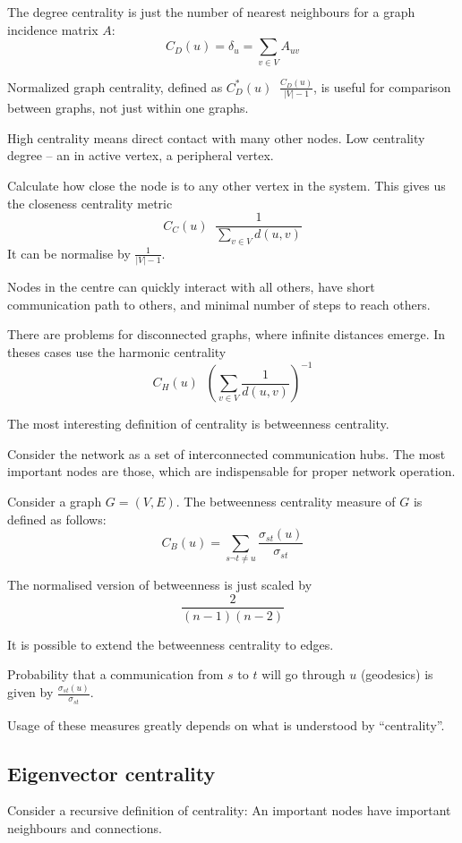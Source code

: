 \documentclass[a4paper]{article}
\newcommand{\brac}[1]{{\left ( #1 \right )}}
\newcommand{\abs}[1]{{\left | #1 \right |}}
\newcommand{\defn}{\mathop{\overset{\Delta}{=}}\nolimits}
\begin{document}
The degree centrality is just the number of nearest neighbours for a graph incidence matrix $A$:
\[C_D(u) = \delta_u = \sum_{v\in V} A_{uv}\]

Normalized graph centrality, defined as $C_D^*(u) \defn \frac{C_D(u)}{\abs{V}-1}$, is useful for comparison between graphs, not just within one graphs.

High centrality means direct contact with many other nodes. Low centrality degree -- an in active vertex, a peripheral vertex.

Calculate how close the node is to any other vertex in the system. This gives us the closeness centrality metric
\[C_C(u) \defn \frac{1}{\sum_{v\in V} d(u,v)}\]
It can be normalise by $\tfrac{1}{\abs{V}-1}$.

Nodes in the centre can quickly interact with all others, have short communication path to others, and minimal number of steps to reach others.

There are problems for disconnected graphs, where infinite distances emerge. In theses cases use the harmonic centrality
\[C_H(u)\defn \brac{\sum_{v\in V} \frac{1}{d(u,v)}}^{-1}\]

The most interesting definition of centrality is betweenness centrality.

Consider the network as a set of interconnected communication hubs. The most important nodes are those, which are indispensable for proper network operation. 

Consider a graph $G = \brac{V,E}$.
The betweenness centrality measure of $G$ is defined as follows:
\[C_B(u) = \sum_{s\neg t\neq u}\frac{\sigma_{st}(u)}{\sigma_{st}}\] 

The normalised version of betweenness is just scaled by
\[\frac{2}{(n-1)(n-2)}\]

It is possible to extend the betweenness centrality to edges.

Probability that a communication from $s$ to $t$ will go through $u$ (geodesics) is given by $\frac{\sigma_{st}(u)}{\sigma_{st}}$.

Usage of these measures greatly depends on what is understood by ``centrality''.

\subsection{Eigenvector centrality} %
\label{sub:eigenvector_centrality}

Consider a recursive definition of centrality: An important nodes have important neighbours and connections.
\end{document}
